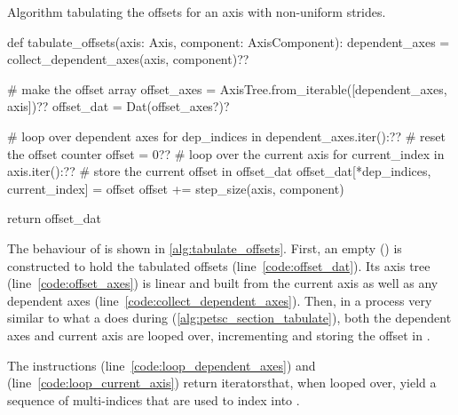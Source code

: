 \documentclass[thesis]{subfiles}
\begin{document}
\begin{algorithm}
  \caption{
    Algorithm tabulating the offsets for an axis with non-uniform strides.
  }

  \begin{flushright}
    \begin{minipage}{.96\textwidth}
      \begin{pyalg2}
        def tabulate_offsets(axis: Axis, component: AxisComponent):
          dependent_axes = collect_dependent_axes(axis, component)?\label{code:collect_dependent_axes}?

          # make the offset array
          offset_axes = AxisTree.from_iterable([dependent_axes, axis])?\label{code:offset_axes}?
          offset_dat = Dat(offset_axes?\label{code:offset_dat})?

          # loop over dependent axes
          for dep_indices in dependent_axes.iter():?\label{code:loop_dependent_axes}?
            # reset the offset counter
            offset = 0?\label{code:reset_offset}?
            # loop over the current axis
            for current_index in axis.iter():?\label{code:loop_current_axis}?
              # store the current offset in offset_dat
              offset_dat[*dep_indices, current_index] = offset
              offset += step_size(axis, component)

          return offset_dat
      \end{pyalg2}
    \end{minipage}
  \end{flushright}
  \label{alg:tabulate_offsets}
\end{algorithm}

The behaviour of  is shown in \cref{alg:tabulate_offsets}.
First, an empty  () is constructed to hold the tabulated offsets (line~\ref{code:offset_dat}).
Its axis tree (line~\ref{code:offset_axes}) is linear and built from the current axis as well as any dependent axes (line~\ref{code:collect_dependent_axes}).
Then, in a process very similar to what a  does during  (\cref{alg:petsc_section_tabulate}), both the dependent axes and current axis are looped over, incrementing and storing the offset in .

The instructions  (line~\ref{code:loop_dependent_axes}) and  (line~\ref{code:loop_current_axis}) return iterators\footnotemark that, when looped over, yield a sequence of multi-indices that are used to index into .
\end{document}
